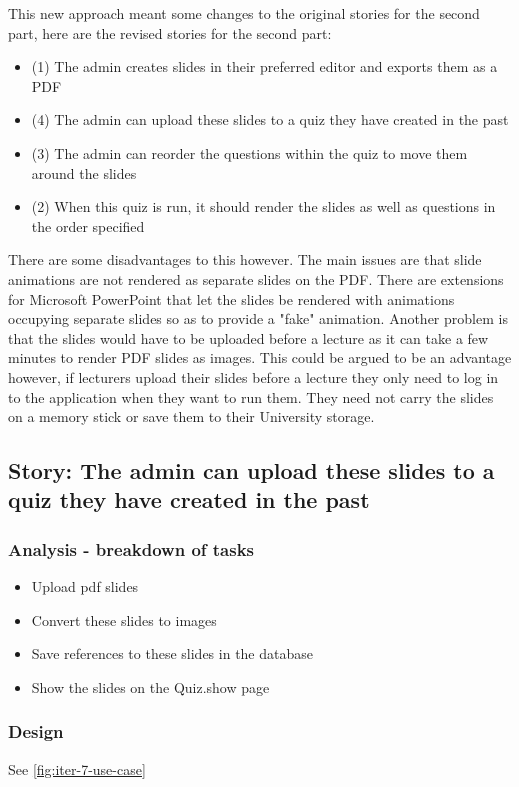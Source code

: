 This new approach meant some changes to the original stories for the second part, here are the revised stories for the second part:
\begin{itemize}
	\item (1) The admin creates slides in their preferred editor and exports them as a PDF
	\item (4) The admin can upload these slides to a quiz they have created in the past
	\item (3) The admin can reorder the questions within the quiz to move them around the slides
	\item (2) When this quiz is run, it should render the slides as well as questions in the order specified
\end{itemize}

There are some disadvantages to this however. The main issues are that slide animations are not rendered as separate slides on the PDF. There are extensions for Microsoft PowerPoint that let the slides be rendered with animations occupying separate slides so as to provide a "fake" animation. Another problem is that the slides would have to be uploaded before a lecture as it can take a few minutes to render PDF slides as images. This could be argued to be an advantage however, if lecturers upload their slides before a lecture they only need to log in to the application when they want to run them. They need not carry the slides on a memory stick or save them to their University storage.
\newpage

\subsection{Story: The admin can upload these slides to a quiz they have created in the past}
\subsubsection{Analysis - breakdown of tasks}
\begin{itemize}
	\item Upload pdf slides
	\item Convert these slides to images
	\item Save references to these slides in the database
	\item Show the slides on the Quiz.show page
\end{itemize}
\subsubsection{Design}
See \ref{fig:iter-7-use-case}

